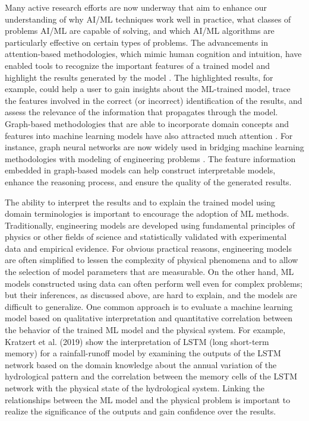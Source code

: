 Many active research efforts are now underway that aim to enhance our understanding of why AI/ML techniques work well in practice, what classes of problems AI/ML are capable of solving, and which AI/ML algorithms are particularly effective on certain types of problems. The advancements in attention-based methodologies, which mimic human cognition and intuition, have enabled tools to recognize the important features of a trained model and highlight the results generated by the model \citep{Xu2015show,zhou2016learning,kafle2017visual,nakka2018deep}. The highlighted results, for example, could help a user to gain insights about the ML-trained model, trace the features involved in the correct (or incorrect) identification of the results, and assess the relevance of the information that propagates through the model. Graph-based methodologies that are able to incorporate domain concepts and features into machine learning models have also attracted much attention \citep{koller2009probabilistic; Nickel et al., 2016, baru2017open,hamilton2017representation, wu2020comprehensive}. For instance, graph neural networks are now widely used in bridging machine learning methodologies with modeling of engineering problems \citep{seo2019differentiable,park2019physicsinduced}. The feature information embedded in graph-based models can help construct interpretable models, enhance the reasoning process, and ensure the quality of the generated results. 

The ability to interpret the results and to explain the trained model using domain terminologies is important to encourage the adoption of ML methods. Traditionally, engineering models are developed using fundamental principles of physics or other fields of science and statistically validated with experimental data and empirical evidence. For obvious practical reasons, engineering models are often simplified to lessen the complexity of physical phenomena and to allow the selection of model parameters that are measurable. On the other hand, ML models constructed using data can often perform well even for complex problems; but their inferences, as discussed above, are hard to explain, and the models are difficult to generalize. One common approach is to evaluate a machine learning model based on qualitative interpretation and quantitative correlation between the behavior of the trained ML model and the physical system. For example, Kratzert et al. (2019) show the interpretation of LSTM (long short-term memory) for a rainfall-runoff model by examining the outputs of the LSTM network based on the domain knowledge about the annual variation of the hydrological pattern and the correlation between the memory cells of the LSTM network with the physical state of the hydrological system. Linking the relationships between the ML model and the physical problem is important to realize the significance of the outputs and gain confidence over the results. 

